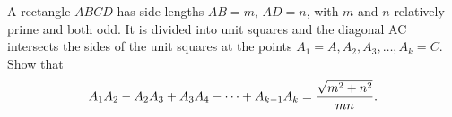 A rectangle $ABCD$ has side lengths $AB = m$,  $AD = n$,  with $m$ and $n$ relatively prime and both odd. It is divided into unit squares and the diagonal AC intersects the sides of the unit squares at the points $A_1 = A, A_2, A_3, \ldots , A_k = C$. Show that \[ A_1A_2 - A_2A_3 + A_3A_4 - \cdots + A_{k-1}A_k = {\sqrt{m^2+n^2}\over mn}.  \]